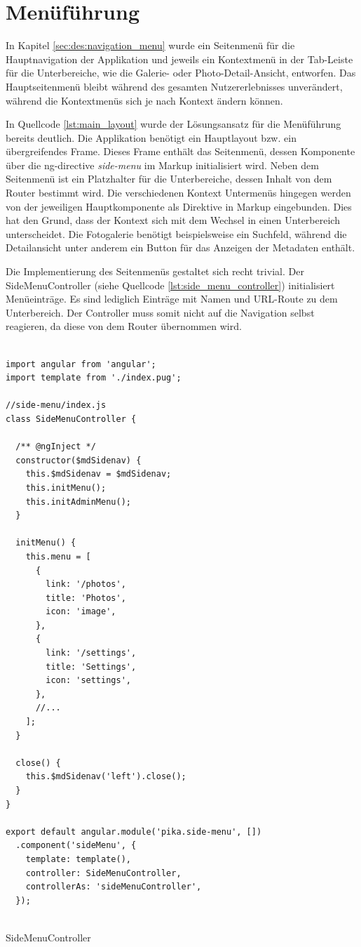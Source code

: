 \section{Menüführung}

In Kapitel \ref{sec:des:navigation_menu} wurde ein Seitenmenü für die Hauptnavigation der Applikation und jeweils ein Kontextmenü in der Tab-Leiste für die Unterbereiche, wie die Galerie- oder Photo-Detail-Ansicht, entworfen. Das Hauptseitenmenü bleibt während des gesamten Nutzererlebnisses unverändert, während die Kontextmenüs sich je nach Kontext ändern können.

In Quellcode \ref{lst:main_layout} wurde der Lösungsansatz für die Menüführung bereits deutlich. Die Applikation benötigt ein Hauptlayout bzw. ein übergreifendes Frame. Dieses Frame enthält das Seitenmenü, dessen Komponente über die \gls{ng-directive} \emph{side-menu} im Markup initialisiert wird. Neben dem Seitenmenü ist ein Platzhalter für die Unterbereiche, dessen Inhalt von dem Router bestimmt wird. Die verschiedenen Kontext Untermenüs hingegen werden von der jeweiligen Hauptkomponente als Direktive in Markup eingebunden. Dies hat den Grund, dass der Kontext sich mit dem Wechsel in einen Unterbereich unterscheidet. Die Fotogalerie benötigt beispielsweise ein Suchfeld, während die Detailansicht unter anderem ein Button für das Anzeigen der Metadaten enthält.

Die Implementierung des Seitenmenüs gestaltet sich recht trivial. Der SideMenuController (siehe Quellcode \ref{lst:side_menu_controller}) initialisiert Menüeinträge. Es sind lediglich Einträge mit Namen und URL-Route zu dem Unterbereich. Der Controller muss somit nicht auf die Navigation selbst reagieren, da diese von dem Router übernommen wird.

\begin{listing}[H]
\begin{verbatim}

import angular from 'angular';
import template from './index.pug';

//side-menu/index.js
class SideMenuController {

  /** @ngInject */
  constructor($mdSidenav) {
    this.$mdSidenav = $mdSidenav;
    this.initMenu();
    this.initAdminMenu();
  }

  initMenu() {
    this.menu = [
      {
        link: '/photos',
        title: 'Photos',
        icon: 'image',
      },
      {
        link: '/settings',
        title: 'Settings',
        icon: 'settings',
      },
      //...
    ];
  }

  close() {
    this.$mdSidenav('left').close();
  }
}

export default angular.module('pika.side-menu', [])
  .component('sideMenu', {
    template: template(),
    controller: SideMenuController,
    controllerAs: 'sideMenuController',
  });


\end{verbatim}
\caption{SideMenuController}
\label{lst:side_menu_controller}
\end{listing}


